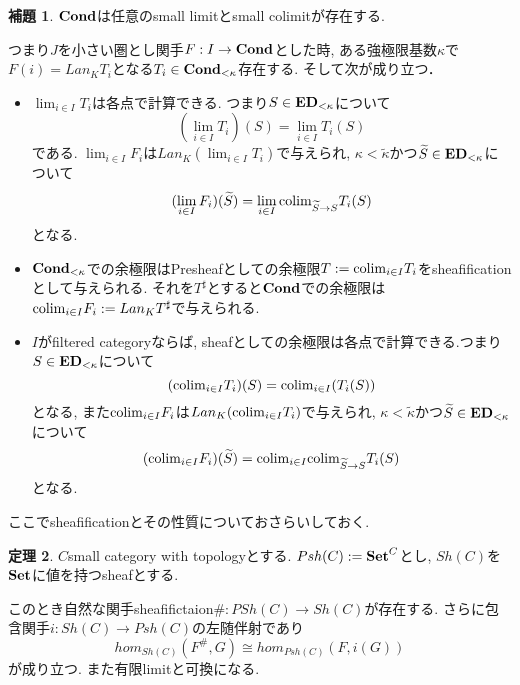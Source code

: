 \documentclass[dvipdfmx,a4paper,11pt]{article}
\newcommand{\colim}{{\rm colim}}
\theoremstyle{definition}
\newtheorem{thm}{定理}
\newtheorem{lem}[thm]{補題}
\newcommand{\xr}[1]{\textcolor{red}{#1}}
\begin{document}
\begin{tcolorbox}
 [colback = white, colframe = green!35!black, fonttitle = \bfseries,breakable = true]
\begin{lem}\cite[Remark 2.13]{Sch19}
\label{cor-Sch19-rem2.13}
${\bf Cond}$は任意のsmall limitとsmall colimitが存在する.

つまり$J$を小さい圏とし関手$F : I \to {\bf Cond}$とした時, 
ある強極限基数$\kappa$で$F(i) = Lan_{K}T_i$となる$T_i \in {\bf Cond_{<\kappa}}$存在する.
そして次が成り立つ． 
\begin{itemize}
\item $\lim_{i \in I} T_i$は各点で計算できる.
つまり$S \in { \bf ED}_{< \kappa}$について
$$(\lim_{i \in I} T_i)(S)= \lim_{i \in I} T_i(S)$$である. $\lim_{i \in I}F_i$は$Lan_{K}(\lim_{i \in I} T_i)$で与えられ, $\kappa <\widetilde{\kappa}$かつ$\widetilde{S} \in { \bf ED}_{< \kappa}$について
$$
(\lim_{i \in I}F_i)(\widetilde{S})
=\lim_{i \in I} \colim_{\widetilde{S} \to S} T_i(S)
$$
となる. 
\item ${\bf Cond_{<\kappa}}$での余極限はPresheafとしての余極限$T:=\colim_{i \in I} T_i$をsheafificationとして与えられる. 
それを$T^{\sharp}$とすると${\bf Cond}$での余極限は
$\colim_{i \in I}F_i := Lan_{K}T^{\sharp}$で与えられる. 
\item $I$がfiltered categoryならば, sheafとしての余極限は各点で計算できる.つまり$S \in { \bf ED}_{< \kappa}$について
$$(\colim_{i \in I} T_i)(S) = \colim_{i \in I} (T_i(S))$$
となる, また$\colim_{i \in I}F_i$は$Lan_{K}(\colim_{i \in I} T_i)$で与えられ, 
$\kappa <\widetilde{\kappa}$かつ$\widetilde{S} \in { \bf ED}_{< \kappa}$について
$$
(\colim_{i \in I}F_i)(\widetilde{S})
=\colim_{i \in I} \colim_{\widetilde{S} \to S} T_i(S)
$$
となる. 
\end{itemize}
\end{lem}
 \end{tcolorbox}
 
 ここでsheafificationとその性質についておさらいしておく. 
  \begin{tcolorbox}
 [colback = white, colframe = green!35!black, fonttitle = \bfseries,breakable = true]
 \begin{thm}\cite{Sha2}
 $C$small category with topologyとする. 
 $Psh(C) :={\bf Set}^{C}$とし, $Sh(C)$を${\bf Set}$に値を持つsheafとする.
 
 このとき自然な関手sheafifictaion$\# : PSh(C) \to Sh(C)$が存在する.
 さらに包含関手$i : Sh(C) \to Psh(C)$の左随伴射であり
 $$
hom_{Sh(C)}(F^{\#}, G) \cong hom_{Psh(C)}(F, i(G)) 
 $$
 が成り立つ. また有限limitと可換になる.
 \end{thm}
 \end{tcolorbox}
 
\end{document}
